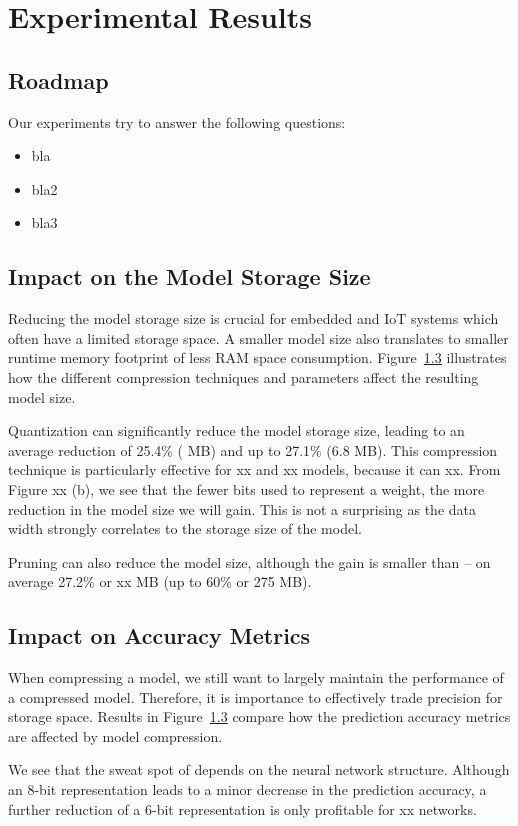 \section{Experimental Results}


\subsection{Roadmap}
Our experiments try to answer the following questions:

\begin{itemize}
\item bla
\item bla2
\item bla3
\end{itemize}

\subsection{Impact on the Model Storage Size}
Reducing the model storage size is crucial for embedded and IoT systems which often have a limited storage space. A smaller model size also
translates to smaller runtime memory footprint of less RAM space consumption. Figure~\ref{} illustrates how the different compression
techniques and parameters affect the resulting model size.

Quantization can significantly reduce the model storage size, leading to an average reduction of 25.4\% ( MB) and up to 27.1\% (6.8 MB). This
compression technique is particularly effective for xx and xx models, because it can xx. From Figure xx (b), we see that the fewer bits
used to represent a weight, the more reduction in the model size we will gain. This is not a surprising as the data width strongly
correlates to the storage size of the model.


Pruning can also reduce the model size, although the gain is smaller than \quantization -- on average 27.2\% or xx MB (up to 60\% or 275 MB).


\subsection{Impact on Accuracy Metrics}
When compressing a model, we still want to largely maintain the performance of a compressed model. Therefore, it is importance to
effectively trade precision for storage space. Results in Figure~\ref{} compare how the prediction accuracy metrics are affected by model
compression.

We see that the sweat spot of \quantization depends on the neural network structure. Although an 8-bit representation leads to a minor
decrease in the prediction accuracy, a further reduction of a 6-bit representation is only profitable for xx networks.

